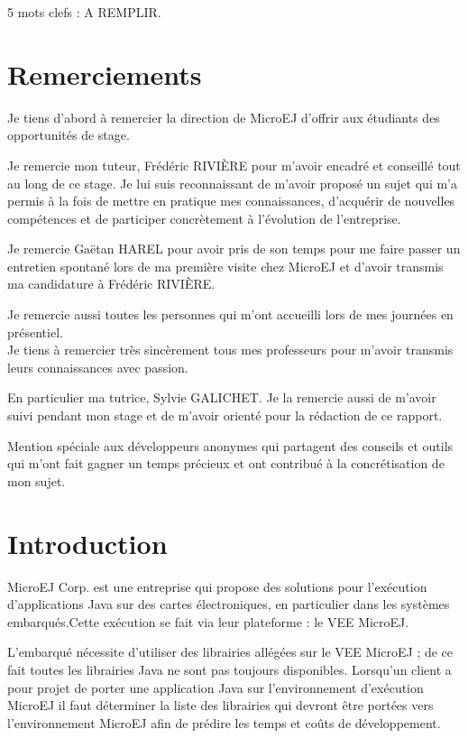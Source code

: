\documentclass[french,a4paper,12pt]{report}
\begin{document}
\vspace*{\fill}

5 mots clefs : A REMPLIR.

\chapter*{Remerciements}

Je tiens d’abord à remercier la direction de MicroEJ d'offrir aux étudiants des opportunités de stage. 

Je remercie mon tuteur, Frédéric RIVIÈRE pour m'avoir encadré et conseillé tout au long de ce stage. Je lui suis reconnaissant de m'avoir proposé un sujet qui m'a permis à la fois de mettre en pratique mes connaissances, d’acquérir de nouvelles compétences et de participer concrètement à l'évolution de l'entreprise.
 
Je remercie Gaëtan HAREL pour avoir pris de son temps pour me faire passer un entretien spontané lors de ma première visite chez MicroEJ et d'avoir transmis ma candidature à Frédéric RIVIÈRE.

Je remercie aussi toutes les personnes qui m'ont accueilli lors de mes journées en présentiel.\\

Je tiens à remercier très sincèrement tous mes professeurs pour m'avoir transmis leurs connaissances avec passion.

En particulier ma tutrice, Sylvie GALICHET. Je la remercie aussi de m'avoir suivi pendant mon stage et de m'avoir orienté pour la rédaction de ce rapport.\\

\vspace*{\fill}

Mention spéciale aux développeurs anonymes qui partagent des conseils et outils qui m'ont fait gagner un temps précieux et ont contribué à la concrétisation de mon sujet.


\chapter{Introduction}

MicroEJ Corp. est une entreprise qui propose des solutions pour l’exécution d’applications Java sur des cartes électroniques, en particulier dans les systèmes embarqués.Cette exécution se fait via leur plateforme : le VEE MicroEJ.

L'embarqué nécessite d’utiliser des librairies allégées sur le VEE MicroEJ ; de ce fait toutes les librairies Java ne sont pas toujours disponibles. Lorsqu’un client a pour projet de porter une application Java sur l’environnement d’exécution MicroEJ il faut déterminer la liste des librairies qui devront être portées vers l’environnement MicroEJ afin de prédire les temps et coûts de développement.
\end{document}

